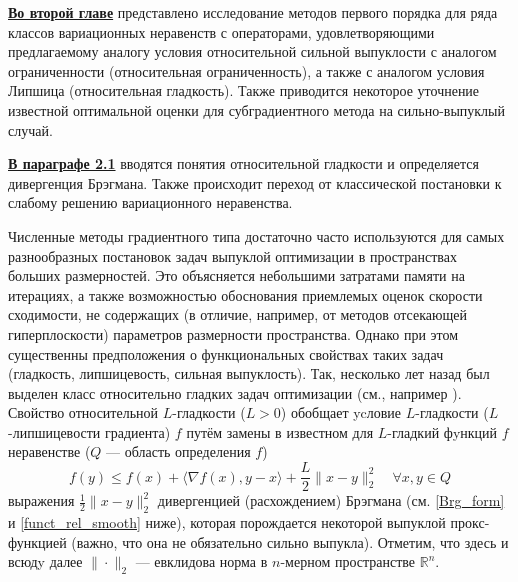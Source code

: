 \underline{\textbf{Во второй главе}} представлено исследование методов первого порядка для ряда классов вариационных неравенств с операторами, удовлетворяющими предлагаемому аналогу условия относительной сильной выпуклости с аналогом ограниченности (относительная ограниченность), а также с аналогом условия Липшица (относительная гладкость). Также приводится некоторое уточнение известной оптимальной оценки для субградиентного метода \cite{Bach_2012} на сильно-выпуклый случай. 

\underline{\textbf{В параграфе 2.1}} вводятся понятия относительной гладкости и определяется дивергенция Брэгмана. Также происходит переход от классической постановки к слабому решению вариационного неравенства. 

Численные методы градиентного типа достаточно часто используются для самых разнообразных постановок задач выпуклой оптимизации в пространствах больших размерностей. Это объясняется небольшими затратами памяти на итерациях, а также возможностью обоснования приемлемых оценок скорости сходимости, не содержащих (в отличие, например, от методов отсекающей гиперплоскости) параметров размерности пространства. Однако при этом существенны предположения о функциональных свойствах таких задач (гладкость, липшицевость, сильная выпуклость). Так, несколько лет назад был выделен класс относительно гладких задач оптимизации (см., например \cite{Bauschke,Drag,Lu_Nesterov_2018}). Свойство относительной $L$-гладкости ($L > 0$) обобщает ycловие $L$-гладкости ($L$-липшицевости градиента)  $f$ путём замены в известном для $L$-гладкий фyнкций $f$ неравенстве ($Q$ --- область определения $f$)
$$
    f(y) \leq f(x) + \langle \nabla{f(x)}, y - x \rangle  + \frac{L}{2} \|x - y \|_2^2 \quad   \forall x, y \in Q
$$	
выражения $\frac{1}{2} \|x - y \|_2^2 $ дивергенцией (расхождением) Брэгмана (см. \eqref{Brg_form} и \eqref{funct_rel_smooth} ниже), которая порождается некоторой выпуклой прокс-функцией (важно, что она не обязательно сильно выпукла). Отметим, что здесь и всюдy далее $\|\cdot\|_2$ --- евклидова норма в $n$-мерном пространстве $\mathbb{R}^n$.

